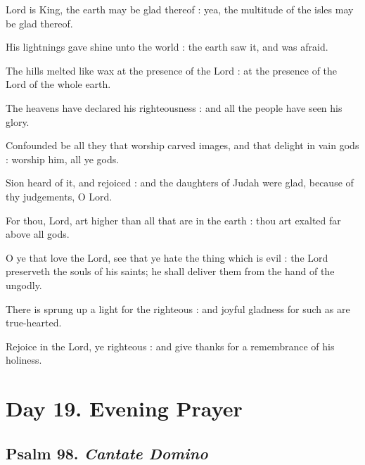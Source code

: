  Lord is King, the earth may be glad thereof : yea, the multitude of the isles may be glad thereof.\par
{}
His lightnings gave shine unto the world : the earth saw it, and was afraid.\par
{}The hills melted like wax at the presence of the Lord : at the presence of the Lord of the whole earth.\par
{}The heavens have declared his righteousness : and all the people have seen his glory.\par
{}Confounded be all they that worship carved images, and that delight in vain gods : worship him, all ye gods.\par
{}Sion heard of it, and rejoiced : and the daughters of Judah were glad, because of thy judgements, O Lord.\par
{}For thou, Lord, art higher than all that are in the earth : thou art exalted far above all gods.\par
{}O ye that love the Lord, see that ye hate the thing which is evil : the Lord preserveth the souls of his saints; he shall deliver them from the hand of the ungodly.\par
{}There is sprung up a light for the righteous : and joyful gladness for such as are true-hearted.\par
{}Rejoice in the Lord, ye righteous : and give thanks for a remembrance of his holiness.\par

\section*{Day 19. Evening Prayer}

\subsection{Psalm 98. \textit{Cantate Domino}}

